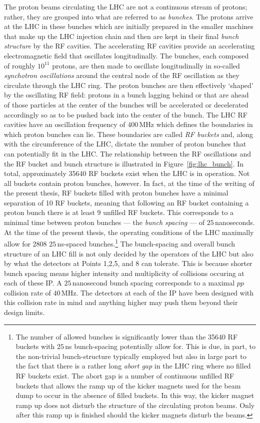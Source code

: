 The proton beams circulating the LHC are not a continuous stream of protons; rather,
they are grouped into what are referred to as \textit{bunches}.
The protons arrive at the LHC in these bunches which are initially prepared
in the smaller machines that make up the LHC injection chain and then are
kept in their final \textit{bunch structure} by the RF cavities.
The accelerating RF cavities provide an accelerating electromagnetic field
that oscillates longitudinally. The bunches, each composed of roughly $10^{11}$ protons,
are then made to oscillate longitudinally in so-called \textit{synchotron oscillations}
around the central node of the RF oscillation as they circulate through the LHC ring.
The proton bunches are then effectively `shaped' by the oscillating RF field: protons in a bunch
lagging behind or that are ahead of those particles at the center of the bunches
will be accelerated or decelerated accordingly so as to be pushed back into the center of the bunch.
The LHC RF cavities have an oscillation frequency of $400$\,MHz which
defines the boundaries in which proton bunches can lie. These boundaries are
called \textit{RF buckets} and, along with
the circumference of the LHC, dictate the number of proton bunches that
can potentially fit in the LHC.
The relationship between the RF oscillations and the RF bucket and bunch structure
is illustrated in Figure~\ref{fig:lhc_bunch}.
In total, approximately 35640 RF buckets exist when the LHC is in operation.
Not all buckets contain proton bunches, however.
In fact, at the time of the writing of the present thesis,
RF buckets filled with proton bunches have a minimal separation of 10 RF buckets, meaning
that following an RF bucket containing a proton bunch there is at least 9 unfilled RF buckets.
This corresponds to a minimal
time between proton bunches --- the \textit{bunch spacing} --- of $25$\,nanoseconds.
At the time of the present thesis, the operating conditions of the LHC maximally
allow for 2808 $25$\,ns-spaced bunches.\footnote{
The number of allowed bunches is significantly lower than the 35640 RF buckets with $25$\,ns
bunch-spacing potentially allow for. This is due, in part, to the non-trivial bunch-structure
typically employed but also in large part to the fact that there is a rather long \textit{abort gap}
in the LHC ring where no filled RF buckets exist.
The abort gap is a number of continuous unfilled RF buckets that allows the ramp up of the kicker
magnets used for the beam dump to occur in the absence of filled buckets.
In this way, the kicker magnet ramp up does not disturb the structure of the circulating proton beams.
Only after this ramp up is finished should the kicker magnets disturb the beams.
}
The bunch-spacing and overall bunch structure of an LHC fill is not only decided
by the operators of the LHC but also by what the detectors at Points 1,2,5, and 8
can tolerate. This is because shorter bunch spacing means higher intensity and multiplicity
of collisions occuring at each of these IP. A $25$\,nanosecond bunch spacing
corresponds to a maximal $pp$ collision rate of $40$\,MHz. The detectors at each
of the IP have been designed with this collision rate in mind and anything
higher may push them beyond their design limits.


